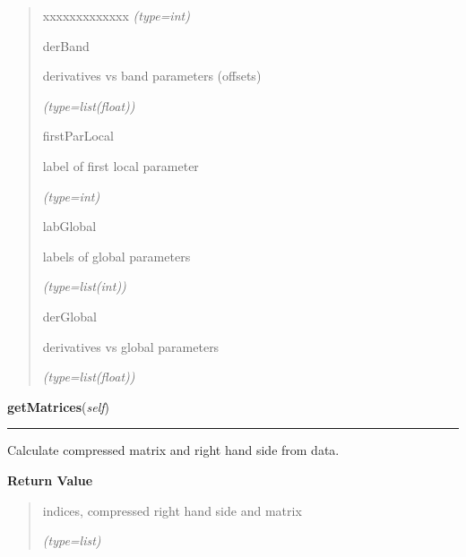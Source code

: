 \begin{boxedminipage}{\funcwidth}
\begin{quote}
\begin{Ventry}{xxxxxxxxxxxxx}
            {\it (type=int)}

          \item[derBand]

          derivatives vs band parameters (offsets)

            {\it (type=list(float))}

          \item[firstParLocal]

          label of first local parameter

            {\it (type=int)}

          \item[labGlobal]

          labels of global parameters

            {\it (type=list(int))}

          \item[derGlobal]

          derivatives vs global parameters

            {\it (type=list(float))}

        \end{Ventry}

      \end{quote}

    \end{boxedminipage}

    \label{gblfit:GblData:getMatrices}

    \vspace{0.5ex}

\hspace{.8\funcindent}\begin{boxedminipage}{\funcwidth}

    \raggedright \textbf{getMatrices}(\textit{self})

    \vspace{-1.5ex}

    \rule{\textwidth}{0.5\fboxrule}
\setlength{\parskip}{2ex}
    Calculate compressed matrix and right hand side from data.

\setlength{\parskip}{1ex}
      \textbf{Return Value}
    \vspace{-1ex}

      \begin{quote}
      indices, compressed right hand side and matrix

      {\it (type=list)}

      \end{quote}

    \end{boxedminipage}

